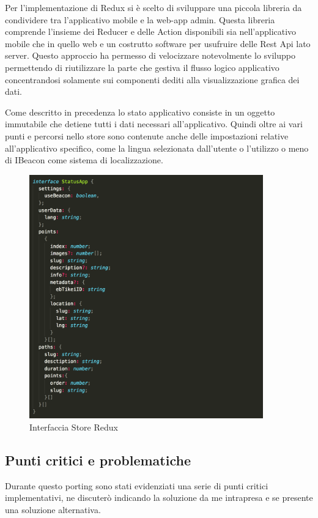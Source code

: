 Per l'implementazione di Redux si è scelto di sviluppare una piccola libreria da condividere tra l'applicativo mobile e la web-app admin. Questa libreria comprende l'insieme dei Reducer e delle Action disponibili sia nell'applicativo mobile che in quello web e un costrutto software per usufruire delle Rest Api lato server. Questo approccio ha permesso di velocizzare notevolmente lo sviluppo permettendo di riutilizzare la parte che gestiva il flusso logico applicativo concentrandosi solamente sui componenti dediti alla visualizzazione grafica dei dati.\vspace{5mm}

Come descritto in precedenza lo stato applicativo consiste in un oggetto immutabile che detiene tutti i dati necessari all'applicativo. Quindi oltre ai vari punti e percorsi nello store sono contenute anche delle impostazioni relative all'applicativo specifico, come la lingua selezionata dall'utente o l'utilizzo o meno di IBeacon come sistema di localizzazione.\vspace{5mm}

\begin{figure}[h]
\centering
\includegraphics[width=0.9\textwidth]{images/store.png}
\caption{Interfaccia Store Redux}
\end{figure}

\subsection{Punti critici e problematiche}
\vspace{5mm}Durante questo porting sono stati evidenziati una serie di punti critici implementativi, ne discuterò indicando la soluzione da me intrapresa e se presente una soluzione alternativa.\vspace{5mm}

